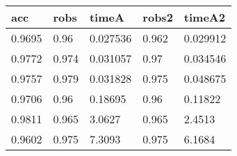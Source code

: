 \begin{tabular}{lllll}
acc & robs & timeA & robs2 & timeA2 \\ 
\hline 
0.9695 & 0.96 & 0.027536 & 0.962 & 0.029912 \\ 
0.9772 & 0.974 & 0.031057 & 0.97 & 0.034546 \\ 
0.9757 & 0.979 & 0.031828 & 0.975 & 0.048675 \\ 
0.9706 & 0.96 & 0.18695 & 0.96 & 0.11822 \\ 
0.9811 & 0.965 & 3.0627 & 0.965 & 2.4513 \\ 
0.9602 & 0.975 & 7.3093 & 0.975 & 6.1684 \\ 
\hline 
\end{tabular}
